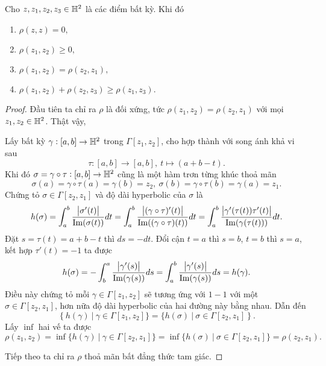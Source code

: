 \begin{prop}\label{prop 2.1.7}
    Cho $z,z_1,z_2,z_3 \in \mathbb{H}^2$ là các điểm bất kỳ. Khi đó
    \begin{enumerate}
        \item $\rho(z,z) = 0,$
        \item $\rho(z_1,z_2) \geq 0,$
        \item $\rho(z_1,z_2) = \rho(z_2,z_1),$
        \item $\rho(z_1,z_2)+\rho(z_2,z_3) \geq \rho(z_1,z_3)$.
    \end{enumerate}
\end{prop}
\begin{proof}
    Đầu tiên ta chỉ ra $\rho$ là đối xứng, tức $\rho(z_1,z_2) = \rho(z_2,z_1)$ với mọi $z_1,z_2 \in \mathbb{H}^2$. Thật vậy, 

        Lấy bất kỳ $\gamma:[a,b]\to \mathbb{H}^2$ trong $\Gamma[z_1,z_2]$, cho hợp thành với song ánh khả vi sau 
    \[\tau: [a,b]\to [a,b],~t \mapsto (a+b-t).\]
    Khi đó $\sigma = \gamma\circ \tau:[a,b]\to \mathbb{H}^2$ cũng là một hàm trơn từng khúc thoả mãn
    \[\sigma(a) = \gamma\circ \tau(a) = \gamma(b)=z_2,~\sigma(b) = \gamma\circ \tau(b) = \gamma(a)=z_1.\] 
    Chứng tỏ $\sigma \in \Gamma[z_2,z_1]$ và độ dài hyperbolic của $\sigma$ là
    \begin{align*}
        h(\sigma) = \int_{a}^{b}{\dfrac{\left|\sigma'(t)\right|}{\operatorname{Im}(\sigma(t))}}dt = \int_{a}^{b}{\dfrac{\left|(\gamma\circ\tau)'(t)\right|}{\operatorname{Im}((\gamma\circ\tau)(t))}}dt=\int_{a}^{b}{\dfrac{\left|\gamma'(\tau(t))\tau'(t)\right|}{\operatorname{Im}(\gamma(\tau(t)))}}dt.
    \end{align*}
    Đặt $s = \tau(t) = a+b-t$ thì $ds = -dt$. Đổi cận $t=a$ thì $s = b$, $t=b$ thì $s=a$, kết hợp $\tau'(t) = -1$ ta được
    \begin{align*}
        h(\sigma) = -\int_{b}^{a}{\dfrac{\left|\gamma'(s)\right|}{\operatorname{Im}(\gamma(s))}}ds = \int_{a}^{b}{\dfrac{\left|\gamma'(s)\right|}{\operatorname{Im}(\gamma(s))}}ds = h(\gamma).
    \end{align*}
    Điều này chứng tỏ mỗi $\gamma \in \Gamma[z_1,z_2]$ sẽ tương ứng với $1-1$ với một $\sigma \in \Gamma[z_2,z_1]$, hơn nữa độ dài hyperbolic của hai đường này bằng nhau. 
    Dẫn đến 
    \[\left\{h(\gamma)~|~\gamma \in \Gamma[z_1,z_2]\} = \{h(\sigma)~|~\sigma \in \Gamma[z_2,z_1]\right\}.\]
    Lấy $\inf$ hai vế ta được 
    \[\rho(z_1,z_2) = \inf\{h(\gamma)~|~\gamma \in \Gamma[z_2,z_1]\} = \inf\{h(\sigma)~|~\sigma \in \Gamma[z_2,z_1]\} = \rho(z_2,z_1).\] 

    Tiếp theo ta chỉ ra $\rho$ thoả mãn bất đẳng thức tam giác.


\end{proof}
